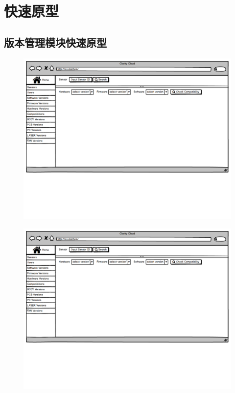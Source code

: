 
\chapter{快速原型}
\section{版本管理模块快速原型}
\begin{figure}[H]
 \centering
 \includegraphics[width=0.8\linewidth,page=1]{pdf/balanar_prototype.pdf}
\end{figure}
\begin{figure}[H]
 \centering
 \includegraphics[width=0.8\linewidth,page=2]{pdf/balanar_prototype.pdf}
\end{figure}
